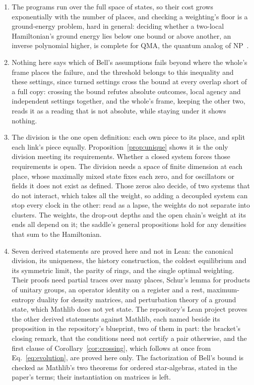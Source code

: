 \documentclass[aps,prd,reprint,superscriptaddress]{revtex4-2}
\begin{document}
\begin{enumerate}
\item The programs run over the full space of states, so their cost grows exponentially with the number of places, and checking a weighting's floor is a ground-energy problem, hard in general: deciding whether a two-local Hamiltonian's ground energy lies below one bound or above another, an inverse polynomial higher, is complete for QMA, the quantum analog of NP~\cite{KempeKitaevRegev2006}.
\item Nothing here says which of Bell's assumptions fails beyond where the whole's frame places the failure, and the threshold  belongs to this inequality and these settings, since turned settings cross the bound at every overlap short of a full copy: crossing the bound refutes absolute outcomes, local agency and independent settings together, and the whole's frame, keeping the other two, reads it as a reading that is not absolute, while staying under it shows nothing.
\item The division is the one open definition: each own piece to its place, and split each link's piece equally. Proposition~\ref{prop:unique} shows it is the only division meeting its requirements. Whether a closed system forces those requirements is open. The division needs a space of finite dimension at each place, whose maximally mixed state fixes each zero, and for oscillators or fields it does not exist as defined. Those zeros also decide, of two systems that do not interact, which takes all the weight, so adding a decoupled system can stop every clock in the other: read as a lapse, the weights do not separate into clusters. The weights, the drop-out depths and the open chain's weight at its ends all depend on it; the saddle's general propositions hold for any densities that sum to the Hamiltonian.
\item Seven derived statements are proved here and not in Lean: the canonical division, its uniqueness, the history construction, the coldest equilibrium and its symmetric limit, the parity of rings, and the single optimal weighting. Their proofs need partial traces over many places, Schur's lemma for products of unitary groups, an operator identity on a register and a rest, maximum-entropy duality for density matrices, and perturbation theory of a ground state, which Mathlib does not yet state. The repository's Lean project proves the other derived statements against Mathlib, each named beside its proposition in the repository's blueprint, two of them in part: the bracket's closing remark, that the conditions need not certify a pair otherwise, and the first clause of Corollary~\ref{cor:crossing}, which follows at once from Eq.~\eqref{eq:evolution}, are proved here only. The factorization of Bell's bound is checked as Mathlib's two theorems for ordered star-algebras, stated in the paper's terms; their instantiation on matrices is left.
\end{enumerate}
\end{document}
